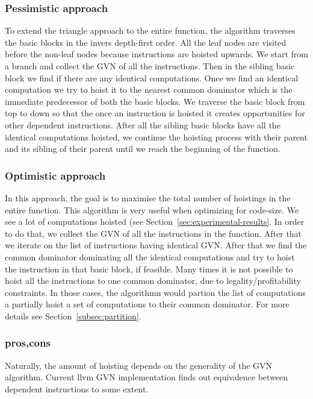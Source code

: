 \documentclass{sig-alternate}
\begin{document}
\subsubsection{Pessimistic approach}
To extend the triangle approach to the entire function, the algorithm traverses
the basic blocks in the invers depth-first order. All the leaf nodes are visited
before the non-leaf nodes because instructions are hoisted upwards. We start
from a branch and collect the GVN of all the instructions. Then in the sibling
basic block we find if there are any identical computations. Once we find an
identical computation we try to hoist it to the nearest common dominator which
is the immediate predecessor of both the basic blocks. We traverse the basic
block from top to down so that the once an instruction is hoisted it creates
opportunities for other dependent instructions. After all the sibling basic
blocks have all the identical computations hoisted, we continue the hoisting
process with their parent and its sibling of their parent until we reach the
beginning of the function.

\subsubsection{Optimistic approach}
In this approach, the goal is to maximise the total number of hoistings in the
entire function.  This algorithm is very useful when optimizing for code-size.
We see a lot of computations hoisted (see
Section~\ref{sec:experimental-results}. In order to do that, we collect the GVN
of all the instructions in the function. After that we iterate on the list of
instructions having identical GVN. After that we find the common dominator
dominating all the identical computations and try to hoist the instruction in
that basic block, if feasible. Many times it is not possible to hoist all the
instructions to one common dominator, due to legality/profitability
constraints. In those cases, the algorithmn would partion the list of
computations a partially hoist a set of computations to their common
dominator. For more details see Section~\ref{subsec:partition}.


\subsubsection{pros,cons}
Naturally, the amount of hoisting depends on the generality of the GVN
algorithm. Current llvm GVN implementation finds out equivalence between
dependent instructions to some extent.
\end{document}
